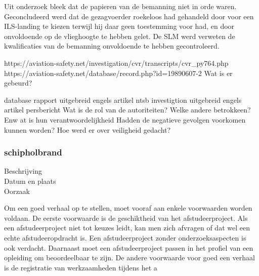 Uit onderzoek bleek dat de papieren van de bemanning niet in orde waren. 
Geconcludeerd werd dat de gezagvoerder roekeloos had gehandeld door voor een ILS-landing te kiezen terwijl hij daar geen toestemming voor had, en door onvoldoende op de vlieghoogte te hebben gelet. 
De SLM werd verweten de kwalificaties van de bemanning onvoldoende te hebben gecontroleerd.

https://aviation-safety.net/investigation/cvr/transcripts/cvr_py764.php 
https://aviation-safety.net/database/record.php?id=19890607-2 
Wat is er gebeurd?

\cite{espnSLMterugblik}
\cite{dennisRosier01052020}
\cite{hassing07062020slmramp}
\cite{amsterdamArchiefSLM}
\cite{rtvOost06062019nabestaande}
\cite{breda07062021AndroSnel}
\cite{andereTijdenSLMCrash}
\cite{wikiSLMRamp}
database
\cite{aviationReport}
rapport
\cite{aviationSLMCrashAccidentInvestigation}
\cite{mcDonnelDouglasCommissionReportSLMCrash}
\cite{wikiSRFlight764}
\cite{nos07062019SLMTerugblik}
\cite{dagvantoenSLMCrash}
\cite{waterkantNesty07061989}
uitgebreid engels artikel
\cite{eduNandlalSRCrash}
ntsb investigtion
\cite{oldjetsSRAirways}
uitgebreid engels artikel
\cite{cloudberg02012021srflight764}
persbericht
\cite{apnews07061989srplanecrash}
Wat is de rol van de autoriteiten?
Welke andere betrokkeen? Enw at is hun verantwoordelijkheid
Hadden de negatieve gevolgen voorkomen kunnen worden?
Hoe werd er over veiligheid gedacht?



\subsubsection{schipholbrand}

\begin{description}
\item[Beschrijving]
\item[Datum en plaats] 
\item[Oorzaak]
\end{description}
Om een goed verhaal op te stellen, moet vooraf aan enkele voorwaarden
worden voldaan. De eerste voorwaarde is de geschiktheid van het
afstudeerproject. Als een afstudeerproject niet tot keuzes leidt, kan
men zich afvragen of dat wel een echte afstudeeropdracht is. Een
afstudeerproject zonder onderzoeksaspecten is ook verdacht. Daarnaast
moet een afstudeerproject passen in het profiel van een opleiding om
beoordeelbaar te zijn. De andere voorwaarde voor goed een verhaal is
de registratie van werkzaamheden tijdens het a


